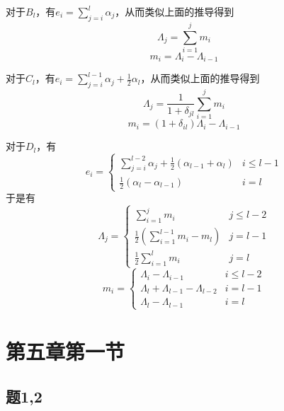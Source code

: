 \documentclass{ctexart}
\begin{document}
	对于$B_l$，有$e_i=\sum_{j=i}^l\alpha_j$，从而类似上面的推导得到
	\begin{equation}
	\Lambda_j=\sum_{i=1}^j m_i
	\end{equation}
	\begin{equation}
	m_i=\Lambda_i-\Lambda_{i-1}
	\end{equation}
	
	对于$C_l$，有$e_i=\sum_{j=i}^{l-1}\alpha_j+\frac{1}{2}\alpha_l$，从而类似上面的推导得到
	\begin{equation}
	\Lambda_j=\frac{1}{1+\delta_{jl}}\sum_{i=1}^j m_i
	\end{equation}
	\begin{equation}
	m_i=(1+\delta_{il})\Lambda_i-\Lambda_{i-1}
	\end{equation}
	
	对于$D_l$，有
	\begin{equation}
	e_i=\begin{cases}
	\sum_{j=i}^{l-2}\alpha_j+\frac{1}{2}(\alpha_{l-1}+\alpha_l) & i\leq l-1\\
	\frac{1}{2}(\alpha_l-\alpha_{l-1}) & i=l
	\end{cases}
	\end{equation}
	于是有
	\begin{equation}
	\Lambda_j=\begin{cases}
	\sum_{i=1}^j m_i & j\leq l-2\\
	\frac{1}{2}\left(\sum_{i=1}^{l-1}m_i-m_l\right) & j=l-1\\
	\frac{1}{2}\sum_{i=1}^l m_i & j=l
	\end{cases}
	\end{equation}
	\begin{equation}
	m_i=\begin{cases}
	\Lambda_i-\Lambda_{i-1} & i\leq l-2\\
	\Lambda_l+\Lambda_{l-1}-\Lambda_{l-2} & i=l-1\\
	\Lambda_l-\Lambda_{l-1} & i=l
	\end{cases}
	\end{equation}
	
	\section{第五章第一节}
	
	\subsection{题1,2}
	
\end{document}

